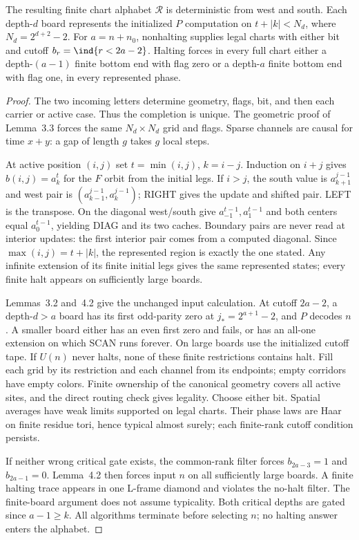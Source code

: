 \begin{lemma}\label{lem:three-chart}
The resulting finite chart alphabet $\mathcal R$ is deterministic from west and south. Each depth-$d$ board represents the initialized $P$ computation on $t+|k|<N_d$, where $N_d=2^{d+2}-2$. For $a=n+n_0$, nonhalting supplies legal charts with either bit and cutoff $b_r=\ind\{r<2a-2\}$. Halting forces in every full chart either a depth-$(a-1)$ finite bottom end with flag zero or a depth-$a$ finite bottom end with flag one, in every represented phase.
\end{lemma}
\begin{proof}
The two incoming letters determine geometry, flags, bit, and then each carrier or active case. Thus the completion is unique. The geometric proof of Lemma~3.3 forces the same $N_d\times N_d$ grid and flags. Sparse channels are causal for time $x+y$: a gap of length $g$ takes $g$ local steps.

At active position $(i,j)$ set $t=\min(i,j)$, $k=i-j$. Induction on $i+j$ gives $b(i,j)=a^t_k$ for the $F$ orbit from the initial legs. If $i>j$, the south value is $a^{j-1}_{k+1}$ and west pair is $(a^{j-1}_{k-1},a^{j-1}_k)$; RIGHT gives the update and shifted pair. LEFT is the transpose. On the diagonal west/south give $a^{t-1}_{-1},a^{t-1}_{1}$ and both centers equal $a^{t-1}_0$, yielding DIAG and its two caches. Boundary pairs are never read at interior updates: the first interior pair comes from a computed diagonal. Since $\max(i,j)=t+|k|$, the represented region is exactly the one stated. Any infinite extension of its finite initial legs gives the same represented states; every finite halt appears on sufficiently large boards.

Lemmas~3.2 and~4.2 give the unchanged input calculation. At cutoff $2a-2$, a depth-$d>a$ board has its first odd-parity zero at $j_*=2^{a+1}-2$, and $P$ decodes $n$. A smaller board either has an even first zero and fails, or has an all-one extension on which SCAN runs forever. On large boards use the initialized cutoff tape. If $U(n)$ never halts, none of these finite restrictions contains halt. Fill each grid by its restriction and each channel from its endpoints; empty corridors have empty colors. Finite ownership of the canonical geometry covers all active sites, and the direct routing check gives legality. Choose either bit. Spatial averages have weak limits supported on legal charts. Their phase laws are Haar on finite residue tori, hence typical almost surely; each finite-rank cutoff condition persists.

If neither wrong critical gate exists, the common-rank filter forces $b_{2a-3}=1$ and $b_{2a-1}=0$. Lemma~4.2 then forces input $n$ on all sufficiently large boards. A finite halting trace appears in one L-frame diamond and violates the no-halt filter. The finite-board argument does not assume typicality. Both critical depths are gated since $a-1\ge k$. All algorithms terminate before selecting $n$; no halting answer enters the alphabet.
\end{proof}

